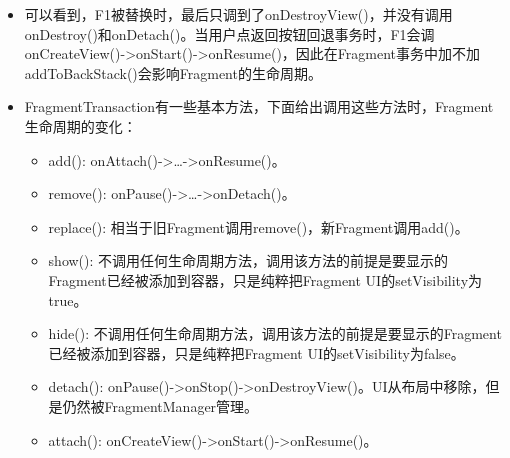 \documentclass[9pt, b5paaper]{book}
\begin{document}
\begin{itemize}
\item 可以看到，F1被替换时，最后只调到了onDestroyView()，并没有调用onDestroy()和onDetach()。当用户点返回按钮回退事务时，F1会调onCreateView()->onStart()->onResume()，因此在Fragment事务中加不加addToBackStack()会影响Fragment的生命周期。
\item FragmentTransaction有一些基本方法，下面给出调用这些方法时，Fragment生命周期的变化：
\begin{itemize}
\item add(): onAttach()->…->onResume()。
\item remove(): onPause()->…->onDetach()。
\item replace(): 相当于旧Fragment调用remove()，新Fragment调用add()。
\item show(): 不调用任何生命周期方法，调用该方法的前提是要显示的Fragment已经被添加到容器，只是纯粹把Fragment UI的setVisibility为true。
\item hide(): 不调用任何生命周期方法，调用该方法的前提是要显示的Fragment已经被添加到容器，只是纯粹把Fragment UI的setVisibility为false。
\item detach(): onPause()->onStop()->onDestroyView()。UI从布局中移除，但是仍然被FragmentManager管理。
\item attach(): onCreateView()->onStart()->onResume()。
\end{itemize}
\end{itemize}
\end{document}

